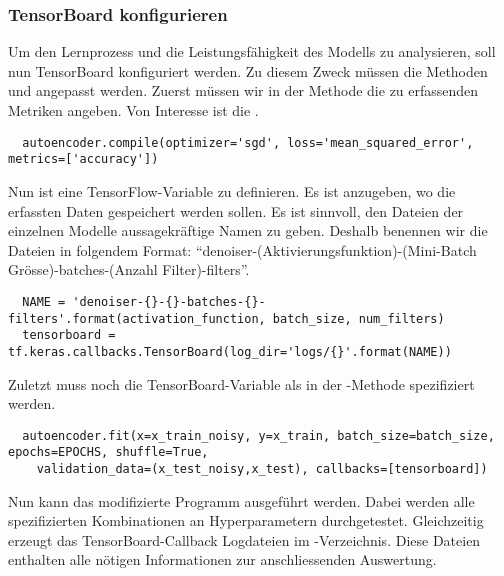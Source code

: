\subsubsection{TensorBoard konfigurieren}
Um den Lernprozess und die Leistungsfähigkeit des Modells zu analysieren,
soll nun TensorBoard konfiguriert werden.
Zu diesem Zweck müssen die Methoden  und  angepasst werden.
Zuerst müssen wir in der  Methode die zu erfassenden Metriken
angeben. Von Interesse ist die .
\begin{verbatim}
  autoencoder.compile(optimizer='sgd', loss='mean_squared_error', metrics=['accuracy'])
\end{verbatim}
Nun ist eine TensorFlow-Variable zu definieren. Es ist anzugeben, wo
die erfassten Daten gespeichert werden sollen. Es ist sinnvoll, den Dateien
der einzelnen Modelle aussagekräftige Namen zu geben. Deshalb benennen wir die
Dateien in folgendem Format: ``denoiser-(Aktivierungsfunktion)-(Mini-Batch
Grösse)-batches-(Anzahl Filter)-filters''.
\begin{verbatim}
  NAME = 'denoiser-{}-{}-batches-{}-filters'.format(activation_function, batch_size, num_filters)
  tensorboard = tf.keras.callbacks.TensorBoard(log_dir='logs/{}'.format(NAME))
\end{verbatim}
Zuletzt muss noch die TensorBoard-Variable als  in der
-Methode spezifiziert werden.
\begin{verbatim}
  autoencoder.fit(x=x_train_noisy, y=x_train, batch_size=batch_size, epochs=EPOCHS, shuffle=True,
    validation_data=(x_test_noisy,x_test), callbacks=[tensorboard])
\end{verbatim}
Nun kann das modifizierte Programm ausgeführt werden. Dabei werden alle
spezifizierten Kombinationen an Hyperparametern durchgetestet. Gleichzeitig
erzeugt das TensorBoard-Callback Logdateien im -Verzeichnis. Diese
Dateien enthalten alle nötigen Informationen zur anschliessenden Auswertung.


